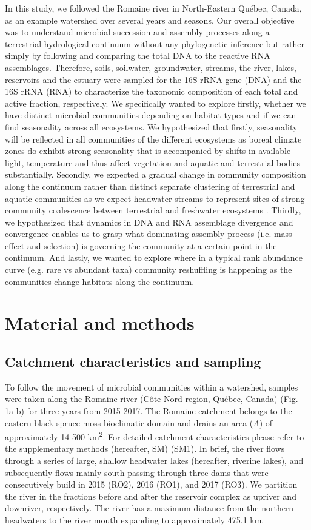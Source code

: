 \documentclass[12pt,a4paper]{article} %
\begin{document}
In this study, we followed the Romaine river in North-Eastern Qu\'{e}bec, Canada, as an example watershed over several years and seasons. Our overall objective was to understand microbial succession and assembly processes along a terrestrial-hydrological continuum without any phylogenetic inference but rather simply by following and comparing the total DNA to the reactive RNA assemblages. Therefore, soils, soilwater, groundwater, streams, the river, lakes, reservoirs and the estuary were sampled for the 16S rRNA gene (DNA) and the 16S rRNA (RNA) to characterize the taxonomic composition of each total and active fraction, respectively. We specifically wanted to explore firstly, whether we have distinct microbial communities depending on habitat types and if we can find seasonality across all ecosystems. We hypothesized that firstly, seasonality will be reflected in all communities of the different ecosystems as boreal climate zones do exhibit strong seasonality that is accompanied by shifts in available light, temperature and thus affect vegetation and aquatic and terrestrial bodies substantially. Secondly, we expected a gradual change in community composition along the continuum rather than distinct separate clustering of terrestrial and aquatic communities as we expect headwater streams to represent sites of strong community coalescence between terrestrial and freshwater ecosystems \citep{Mansour2018}. Thirdly, we hypothesized that dynamics in DNA and RNA assemblage divergence and convergence enables us to grasp what dominating assembly process (i.e. mass effect and selection) is governing the community at a certain point in the continuum. And lastly, we wanted to explore where in a typical rank abundance curve (e.g. rare vs abundant taxa) community reshuffling is happening as the communities change habitats along the continuum.

\section*{Material and methods}
\subsection*{Catchment characteristics and sampling}
To follow the movement of microbial communities within a watershed, samples were taken along the Romaine river (C\^{o}te-Nord region, Qu\'{e}bec, Canada) (Fig. 1a-b) for three years from 2015-2017. The Romaine catchment belongs to the eastern black spruce-moss bioclimatic domain and drains an area (\textit{A}) of approximately 14 500 km\textsuperscript{2}. For detailed catchment characteristics please refer to the supplementary methods (hereafter, SM) (SM1). In brief, the river flows through a series of large, shallow headwater lakes (hereafter, riverine lakes), and subsequently flows mainly south passing through three dams that were consecutively build in 2015 (RO2), 2016 (RO1), and 2017 (RO3). We partition the river in the fractions before and after the reservoir complex as upriver and downriver, respectively. The river has a maximum distance from the northern headwaters to the river mouth expanding to approximately 475.1 km.
\end{document}
